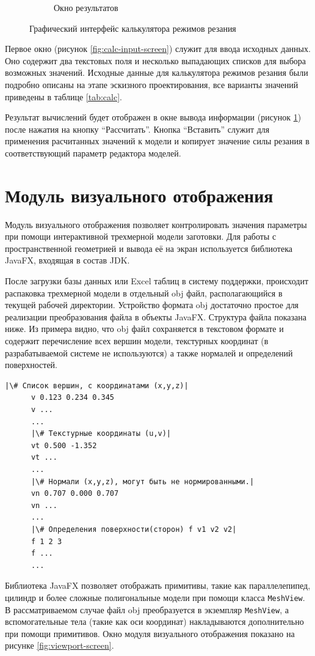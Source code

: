 \documentclass[14pt,oneside,final]{extreport}
\begin{document}
\begin{figure}[h!]
\begin{subfigure}[t]{0.5\textwidth}
			\caption{Окно результатов} \label{fig:calc-output-screen}
		\end{subfigure}
		\caption{Графический интерфейс калькулятора режимов резания} \label{fig:calc-screen}
	\end{figure}
	
	Первое окно (рисунок \ref{fig:calc-input-screen}) служит для ввода исходных данных. Оно содержит два текстовых поля и несколько выпадающих списков для выбора возможных значений. Исходные данные для калькулятора режимов резания были подробно описаны на этапе эскизного проектирования, все варианты значений приведены в таблице \ref{tab:calc}.  
		
	Результат вычислений будет отображен в окне вывода информации (рисунок \ref{fig:calc-output-screen}) после нажатия на кнопку ``Рассчитать''. Кнопка ``Вставить'' служит для применения расчитанных значений к модели и копирует значение силы резания в соответствующий параметр редактора моделей. 	

	\section{Модуль визуального отображения}	
	Модуль визуального отображения позволяет контролировать значения параметры при помощи интерактивной трехмерной модели заготовки. Для работы с пространственной геометрией и вывода её на экран используется библиотека JavaFX, входящая в состав JDK. 
	
	После загрузки базы данных или Excel таблиц в систему поддержки, происходит распаковка трехмерной модели в отдельный obj файл, располагающийся в текущей рабочей директории. Устройство формата obj достаточно простое для реализации преобразования файла в объекты JavaFX. Структура файла показана ниже. Из примера видно, что obj файл сохраняется в текстовом формате и содержит перечисление всех вершин модели, текстурных координат (в разрабатываемой системе не используются) а также нормалей и определений поверхностей. 
	
	\begin{lstlisting}[style=nonumbers]
	  |\# Список вершин, с координатами (x,y,z)|
	  v 0.123 0.234 0.345
	  v ...
	  ...
	  |\# Текстурные координаты (u,v)|
	  vt 0.500 -1.352
	  vt ...
	  ...
	  |\# Нормали (x,y,z), могут быть не нормированными.|
	  vn 0.707 0.000 0.707
	  vn ...
	  ...
	  |\# Определения поверхности(сторон) f v1 v2 v2|
	  f 1 2 3
	  f ...
	  ...
	\end{lstlisting} 

	Библиотека JavaFX позволяет отображать примитивы, такие как параллелепипед, цилиндр и более сложные полигональные модели при помощи класса \texttt{MeshView}. В рассматриваемом случае файл obj преобразуется в экземпляр \texttt{MeshView}, а вспомогательные тела (такие как оси координат) накладываются дополнительно при помощи примитивов. Окно модуля визуального отображения показано на рисунке \ref{fig:viewport-screen}.
	
\end{document}
